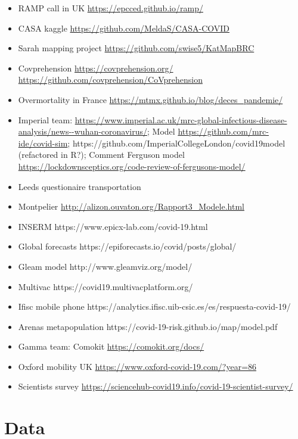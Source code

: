 \documentclass[10pt]{article}
\begin{document}
\begin{itemize}
	\item RAMP call in UK \url{https://epcced.github.io/ramp/}
	\item CASA kaggle \url{https://github.com/MeldaS/CASA-COVID}
	\item Sarah mapping project \url{https://github.com/swise5/KatMapBRC}
	\item Covprehension \url{https://covprehension.org/} \url{https://github.com/covprehension/CoVprehension}
	\item Overmortality in France \url{https://mtmx.github.io/blog/deces_pandemie/}
	\item Imperial team: \url{https://www.imperial.ac.uk/mrc-global-infectious-disease-analysis/news--wuhan-coronavirus/}; Model \url{https://github.com/mrc-ide/covid-sim}; https://github.com/ImperialCollegeLondon/covid19model (refactored in R?); Comment Ferguson model \url{https://lockdownsceptics.org/code-review-of-fergusons-model/}
	\item Leeds questionaire transportation %
	\item Montpelier \url{http://alizon.ouvaton.org/Rapport3_Modele.html}
	\item INSERM https://www.epicx-lab.com/covid-19.html
	\item Global forecasts https://epiforecasts.io/covid/posts/global/
	\item Gleam model http://www.gleamviz.org/model/
	\item Multivac https://covid19.multivacplatform.org/
	\item Ifisc mobile phone https://analytics.ifisc.uib-csic.es/es/respuesta-covid-19/
	\item Arenas metapopulation https://covid-19-risk.github.io/map/model.pdf
	\item Gamma team: Comokit \url{https://comokit.org/docs/}
	\item Oxford mobility UK \url{https://www.oxford-covid-19.com/?year=86}
	\item Scientists survey \url{https://sciencehub-covid19.info/covid-19-scientist-survey/}
\end{itemize}




\section{Data}
\end{document}
